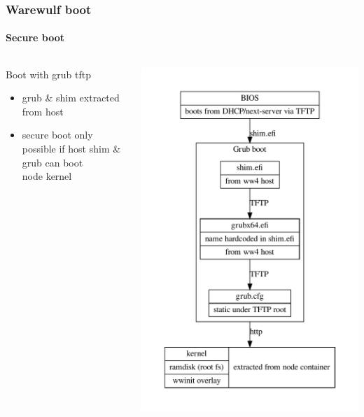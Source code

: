 \documentclass[aspectratio=169]{beamer}
\begin{document}
\begin{frame}[fragile]
\frametitle{Warewulf boot}
\framesubtitle{Secure boot }
\begin{columns}
\begin{block}{Boot with grub tftp}
\begin{itemize}
  \item grub \& shim extracted from host
  \item secure boot only possible if host shim \& grub can boot \\
  node kernel
\end{itemize}
\end{block}
\includegraphics[width=.7\linewidth]{grub_ipxe}
\column{2cm}
\end{columns}
\end{frame}
\end{document}
